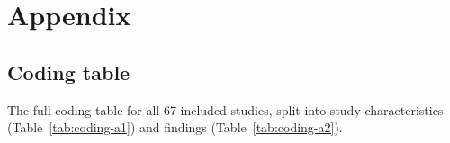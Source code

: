 \documentclass[12pt, a4paper]{report}
\begin{document}
\newpage
\tableofcontents
\newpage








\newpage
\printbibliography[heading=bibintoc, title={References}]

\newpage
\appendix
\chapter*{Appendix}

\section*{Coding table}
\label{app:coding}

\noindent The full coding table for all 67 included studies, split into study characteristics (Table~\ref{tab:coding-a1}) and findings (Table~\ref{tab:coding-a2}).


\clearpage


\end{document}
